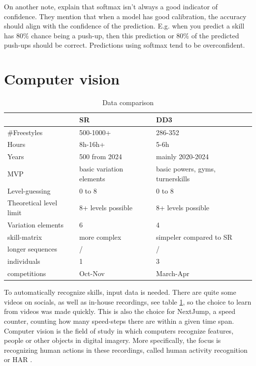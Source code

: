 On another note, \textcite{Guo_2017} explain that softmax isn't always a good indicator of confidence. They mention that when a model has good calibration, the accuracy should align with the confidence of the prediction. E.g. when you predict a skill has 80\% chance being a push-up, then this prediction or 80\% of the predicted push-ups should be correct. Predictions using softmax tend to be overconfident.



\section{Computer vision}
\label{subsec:bp-literature-computer-vision}

\begin{table}[t]
    \centering
    \begin{tabular}{|l|l|l|}
        \hline
        & SR & DD3 \\ \hline
        \#Freestyles & 500-1000+ & 286-352 \\ \hline
        Hours & 8h-16h+ & 5-6h \\ \hline
        Years & 500 from 2024 & mainly 2020-2024 \\ \hline
        MVP & basic variation elements & basic powers, gyms, turnerskills \\ \hline
        Level-guessing & 0 to 8 & 0 to 8 \\ \hline
        Theoretical level limit & 8+ levels possible & 8+ levels possible \\ \hline
        Variation elements & 6 & 4 \\ \hline
        skill-matrix & more complex & simpeler compared to SR \\ \hline
        longer sequences & / & / \\ \hline
        individuals & 1 & 3 \\ \hline
        competitions & Oct-Nov & March-Apr \\ \hline
    \end{tabular}
    \caption{Data comparison}
    \label{tbl:data-comparison-sr-dd}
\end{table}

To automatically recognize skills, input data is needed. There are quite some videos on socials, as well as in-house recordings, see table \ref{tbl:data-comparison-sr-dd}, so the choice to learn from videos was made quickly. This is also the choice for NextJump, a speed counter, counting how many speed-steps there are within a given time span.
Computer vision is the field of study in which computers recognize features, people or other objects in digital imagery. More specifically, the focus is recognizing human actions in these recordings, called human activity recognition or HAR \autocite{Pareek_2020}.

